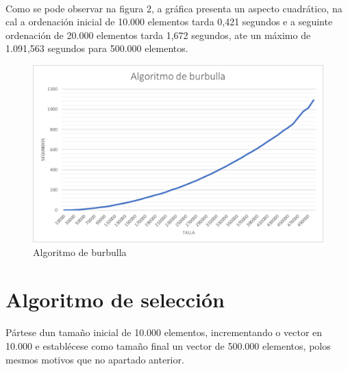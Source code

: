 \documentclass[12pt]{article}
\begin{document}
	\paragraph{}
	Como se pode observar na figura 2, a gráfica presenta un aspecto cuadrático, na cal a ordenación inicial de 10.000 elementos tarda 0,421 segundos e a seguinte ordenación de 20.000 elementos tarda 1,672 segundos, ate un máximo de 1.091,563 segundos para 500.000 elementos.\\
	\begin{figure}[h]
		\centering
		\includegraphics[scale=0.45]{../graficas/burbulla_sobremesa.png}
		\caption{Algoritmo de burbulla}
	\end{figure}
\newpage
\section{Algoritmo de selección}
	\paragraph{}
	Pártese dun tamaño inicial de 10.000 elementos, incrementando o vector en 10.000 e establécese como tamaño final un vector de 500.000 elementos, polos mesmos motivos que no apartado anterior.
\end{document}
